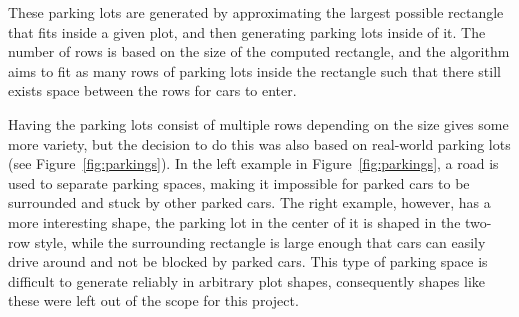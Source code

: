 These parking lots are generated by approximating the largest possible rectangle that fits inside a given plot, and then generating parking lots inside of it.
The number of rows is based on the size of the computed rectangle, and the algorithm aims to fit as many rows of parking lots inside the rectangle such that there still exists space between the rows for cars to enter.

Having the parking lots consist of multiple rows depending on the size gives some more variety, but the decision to do this was also based on real-world parking lots (see Figure~\ref{fig:parkings}).
In the left example in Figure~\ref{fig:parkings}, a road is used to separate parking spaces, making it impossible for parked cars to be surrounded and stuck by other parked cars.
The right example, however, has a more interesting shape, the parking lot in the center of it is shaped in the two-row style, while the surrounding rectangle is large enough that cars can easily drive around and not be blocked by parked cars.
This type of parking space is difficult to generate reliably in arbitrary plot shapes, consequently shapes like these were left out of the scope for this project.
